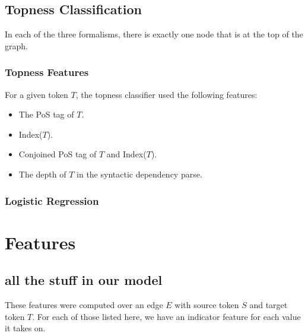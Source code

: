 \documentclass[11pt]{article}
\begin{document}
\subsection{Topness Classification}
In each of the three formalisms, there is exactly one node that is at the top of the graph. 

\subsubsection{Topness Features}
For a given token $T$, the topness classifier used the following features:
\begin{itemize}
\item The PoS tag of $T$.
\item Index($T$).
\item Conjoined PoS tag of $T$ and Index($T$).
\item The depth of $T$ in the syntactic dependency parse. 
\end{itemize}

\subsubsection{Logistic Regression}


\section{Features}

\subsection{all the stuff in our model}

\label{s:features}
These features were computed over an edge $E$ with source token $S$ and target token $T$.  For each of those listed here, we have an indicator feature for each value it takes on. 
\end{document}
